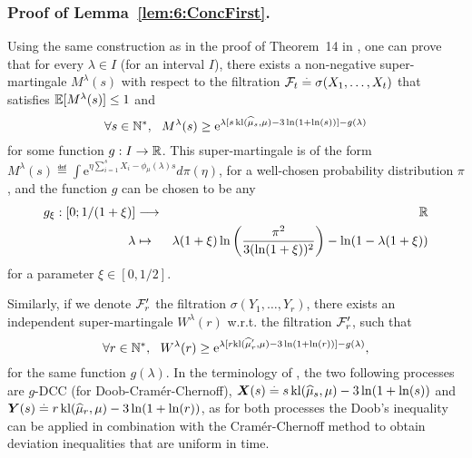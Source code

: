 \subsubsection{Proof of Lemma~\ref{lem:6:ConcFirst}.}
\label{app:6:proofConcFirst}
%
Using the same construction as in the proof of Theorem~14 in \cite{KK18Martingales}, one can prove that for every $\lambda \in I$ (for an interval $I$), there exists a non-negative super-martingale $M^\lambda (s)$ with respect to the filtration $\mathcal{F}_t \overset{.}{=} \sigma(X_1,\dots,X_t)$ that satisfies $\mathbb{E}[M^\lambda(s)] \leq 1$ and
\[\forall s \in \mathbb{N}^*, \ \ M^\lambda (s) \geq \mathrm{e}^{\lambda [s \, \mathrm{kl}(\widehat{\mu}_s,\mu) - 3\ln(1+\ln(s))] - g(\lambda)}\]
for some function $g : I \rightarrow \mathbb{R}$. This super-martingale is of the form
$M^\lambda (s) \eqdef \int \mathrm{e}^{\eta\sum_{i=1}^s X_i - \phi_\mu(\lambda)s} d\pi(\eta)$,
for a well-chosen probability distribution $\pi$, and the function $g$ can be chosen to be any
\begin{eqnarray*}
    g_{\xi} : \left[0; 1/(1+\xi)\right] & \longrightarrow & \mathbb{R} \\
    \lambda & \mapsto & \lambda(1+\xi) \ln \left(\frac{\pi^2}{3(\ln(1+\xi))^2}\right) -  \ln(1 - \lambda(1 + \xi))
\end{eqnarray*}
for a parameter $\xi \in [0,1/2]$.

Similarly, if we denote $\mathcal{F}_r'$ the filtration $\sigma(Y_1,\dots,Y_r)$,
there exists an independent super-martingale $W^\lambda (r)$ w.r.t. the filtration $\mathcal{F}_r'$, such that
\[\forall r \in \mathbb{N}^*, \ \ W^\lambda (r) \geq \mathrm{e}^{\lambda [r\mathrm{kl}(\widehat{\mu}'_r,\mu) - 3\ln(1+\ln(r))] - g(\lambda)},\]
for the same function $g(\lambda)$.
In the terminology of \cite{KK18Martingales},
the two following processes are $g$-DCC (for Doob-Cram\'er-Chernoff),
$\bm{X}(s) \overset{.}{=} s \, \mathrm{kl}(\widehat{\mu}_s,\mu) - 3\ln(1+\ln(s))$ and $\bm{Y}(s) \overset{.}{=} r \, \mathrm{kl}(\widehat{\mu}_r,\mu) - 3\ln(1+\ln(r))$,
as for both processes the Doob's inequality can be applied in combination with the Cram\'er-Chernoff method to obtain deviation inequalities that are uniform in time.

